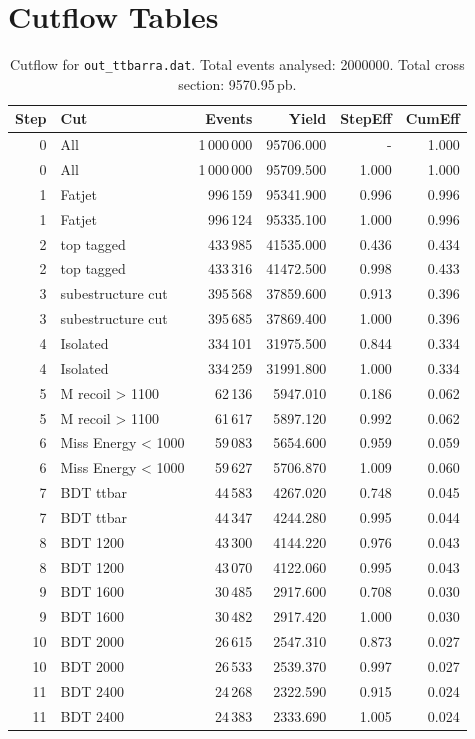 \documentclass{article}
\begin{document}
\section*{Cutflow Tables}
\begin{table}[ht]
\centering
\begin{tabular}{r l r r r r}
\toprule
Step & Cut & Events & Yield & StepEff & CumEff \\
\midrule
0 & All & 1\,000\,000 & 95706.000 & - & 1.000 \\
0 & All & 1\,000\,000 & 95709.500 & 1.000 & 1.000 \\
1 & Fatjet & 996\,159 & 95341.900 & 0.996 & 0.996 \\
1 & Fatjet & 996\,124 & 95335.100 & 1.000 & 0.996 \\
2 & top tagged & 433\,985 & 41535.000 & 0.436 & 0.434 \\
2 & top tagged & 433\,316 & 41472.500 & 0.998 & 0.433 \\
3 & subestructure cut & 395\,568 & 37859.600 & 0.913 & 0.396 \\
3 & subestructure cut & 395\,685 & 37869.400 & 1.000 & 0.396 \\
4 & Isolated & 334\,101 & 31975.500 & 0.844 & 0.334 \\
4 & Isolated & 334\,259 & 31991.800 & 1.000 & 0.334 \\
5 & M recoil > 1100 & 62\,136 & 5947.010 & 0.186 & 0.062 \\
5 & M recoil > 1100 & 61\,617 & 5897.120 & 0.992 & 0.062 \\
6 & Miss Energy < 1000 & 59\,083 & 5654.600 & 0.959 & 0.059 \\
6 & Miss Energy < 1000 & 59\,627 & 5706.870 & 1.009 & 0.060 \\
7 & BDT ttbar & 44\,583 & 4267.020 & 0.748 & 0.045 \\
7 & BDT ttbar & 44\,347 & 4244.280 & 0.995 & 0.044 \\
8 & BDT 1200 & 43\,300 & 4144.220 & 0.976 & 0.043 \\
8 & BDT 1200 & 43\,070 & 4122.060 & 0.995 & 0.043 \\
9 & BDT 1600 & 30\,485 & 2917.600 & 0.708 & 0.030 \\
9 & BDT 1600 & 30\,482 & 2917.420 & 1.000 & 0.030 \\
10 & BDT 2000 & 26\,615 & 2547.310 & 0.873 & 0.027 \\
10 & BDT 2000 & 26\,533 & 2539.370 & 0.997 & 0.027 \\
11 & BDT 2400 & 24\,268 & 2322.590 & 0.915 & 0.024 \\
11 & BDT 2400 & 24\,383 & 2333.690 & 1.005 & 0.024 \\
\bottomrule
\end{tabular}
\caption{Cutflow for \texttt{out\_ttbarra.dat}. Total events analysed: 2000000. Total cross section: 9570.95\,pb.}
\label{tab:cutflow-out-ttbarra-dat}
\end{table}
\end{document}
